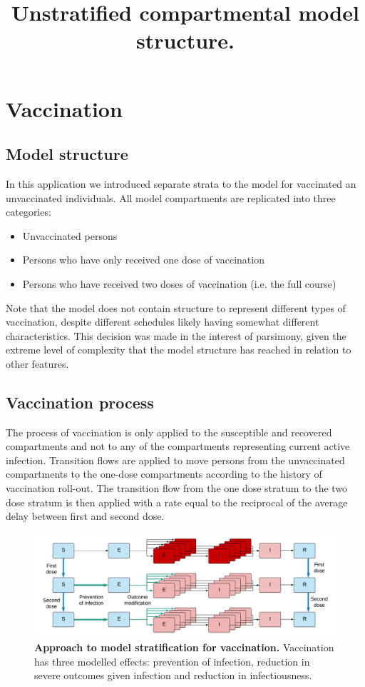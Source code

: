 \section{Vaccination}

\subsection{Model structure}
In this application we introduced separate strata to the model for vaccinated an unvaccinated individuals.
All model compartments are replicated into three categories:

\begin{itemize}
	\item Unvaccinated persons
	\item Persons who have only received one dose of vaccination
	\item Persons who have received two doses of vaccination (i.e. the full course)
\end{itemize}

Note that the model does not contain structure to represent different types of vaccination, despite different schedules likely having somewhat different characteristics.
This decision was made in the interest of parsimony, given the extreme level of complexity that the model structure has reached in relation to other features.

\subsection{Vaccination process}
The process of vaccination is only applied to the susceptible and recovered compartments and not to any of the compartments representing current active infection.
Transition flows are applied to move persons from the unvaccinated compartments to the one-dose compartments according to the history of vaccination roll-out.
The transition flow from the one dose stratum to the two dose stratum is then applied with a rate equal to the reciprocal of the average delay between first and second dose.

\begin{figure}[ht]
    \includegraphics[width=\textwidth]{../covid_19/projects/victoria/victoria_2021/covid_19_vaccination.pdf}
   \title{Unstratified compartmental model structure.}
    \caption{\textbf{Approach to model stratification for vaccination.} Vaccination has three modelled effects: prevention of infection, reduction in severe outcomes given infection and reduction in infectiousness.}
    \label{fig:vaccination}
\end{figure}
